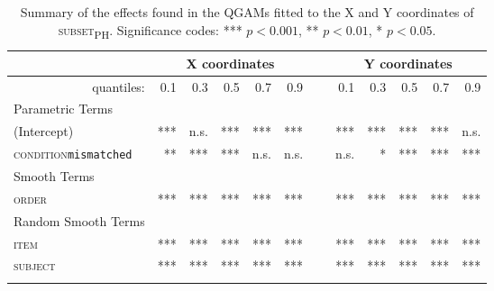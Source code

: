 \begin{table}\fontsize{9}{10}
\caption{Summary of the effects found in the QGAMs fitted to the X and Y coordinates of \textsc{subset\textsubscript{PH}}. Significance codes: *** $p < 0.001$, ** $p < 0.01$, * $p < 0.05$.}
\label{tab:8.9}
\centering
\begin{tabular}{lrrrrrrrrrrr}
\lsptoprule
~                   & \multicolumn{5}{c}{X coordinates}       & \multicolumn{1}{c}{}                       & \multicolumn{5}{c}{Y coordinates}                               \\
\midrule
\multicolumn{1}{r}{quantiles:}          & 0.1        & 0.3        & 0.5        & 0.7        & 0.9  & ~       & 0.1        & 0.3        & 0.5        & 0.7        & 0.9         \\
\midrule
Parametric Terms    & \textbf{~} & \textbf{~} & \textbf{~} & \textbf{~} & \textbf{~} & \textbf{~} & \textbf{~} & \textbf{~} & \textbf{~} & \textbf{~}  \\
\midrule
(Intercept)         & ***        & n.s.         & ***        & ***        & *** & ~       & ***        & ***        & ***        & ***        & n.s.          \\
\textsc{condition}\texttt{mismatched} & **       & ***          & ***        & n.s.        & n.s.    & ~    & n.s.       & *        & ***        & ***        & ***         \\
\midrule
Smooth Terms        & \textbf{~} & \textbf{~} & \textbf{~} & \textbf{~} & \textbf{~} & \textbf{~} & \textbf{~} & \textbf{~} & \textbf{~} & \textbf{~}  \\
\midrule
\textsc{order}               & ***        & ***        & ***        & ***        & ***   & ~     & ***        & ***        & ***        & ***        & ***         \\
\midrule
Random Smooth Terms & \textbf{~} & \textbf{~} & \textbf{~} & \textbf{~} & \textbf{~} & \textbf{~} & \textbf{~} & \textbf{~} & \textbf{~} & \textbf{~}  \\
\midrule
\textsc{item}                & ***        & ***        & ***        & ***        & ***   & ~     & ***        & ***        & ***        & ***        & ***         \\
\textsc{subject}             & ***        & ***        & ***        & ***        & ***  & ~      & ***        & ***        & ***        & ***        & ***        \\
\lspbottomrule
\end{tabular}
\end{table}

